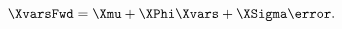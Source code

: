 \begin{equation} \label{eq:nXvarsP}
	\XvarsFwd = \Xmu + \XPhi \Xvars  + \XSigma \error .
\end{equation}